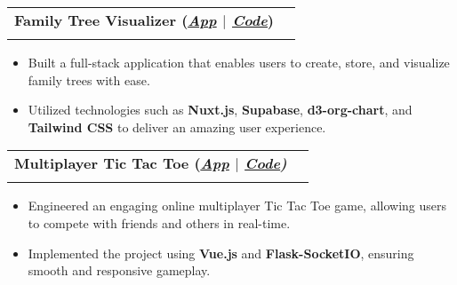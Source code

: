 \documentclass[a4paper,10pt]{article}
\makeatletter
\newcommand{\resumeSubheading}[4]{
  \vspace{-1pt}\item
    \begin{tabular*}{0.97\textwidth}[t]{l@{\extracolsep{\fill}}r}
      \textbf{#1} & #2 \\
      \textit{\normalsize#3} & \textit{\normalsize #4} \\
    \end{tabular*}\vspace{-7pt}
}
\makeatother
\begin{document}
\resumeSubheading
{Family Tree Visualizer (\textit{\href{https://familivistas.vercel.app/}{\textbf{\underline{App}}} $|$ \href{https://github.com/AnkushSarkar10/family-tree-app}{\textbf{\underline{Code}}}})}{}{}{}
\vspace{-10pt}
\begin{itemize}[leftmargin=0.15in]
  \item Built a full-stack application that enables users to create, store, and visualize family trees with ease.
  \item Utilized technologies such as \textbf{Nuxt.js}, \textbf{Supabase}, \textbf{d3-org-chart}, and \textbf{Tailwind CSS} to deliver an amazing user experience.
\end{itemize}
\vspace{-5pt}


\resumeSubheading
{Multiplayer Tic Tac Toe (\textit{\href{https://vue-flask-tic-tac-toe.web.app/}{\textbf{\underline{App}}} $|$ \href{https://github.com/AnkushSarkar10/vue-flask-tic-tac-toe}{\textbf{\underline{Code}}})}}{}{}{}
\vspace{-10pt}
\begin{itemize}[leftmargin=0.15in]
  \item Engineered an engaging online multiplayer Tic Tac Toe game, allowing users to compete with friends and others in real-time.
  \item Implemented the project using \textbf{Vue.js} and \textbf{Flask-SocketIO}, ensuring smooth and responsive gameplay.
\end{itemize}
\vspace{-5pt}


\end{document}
